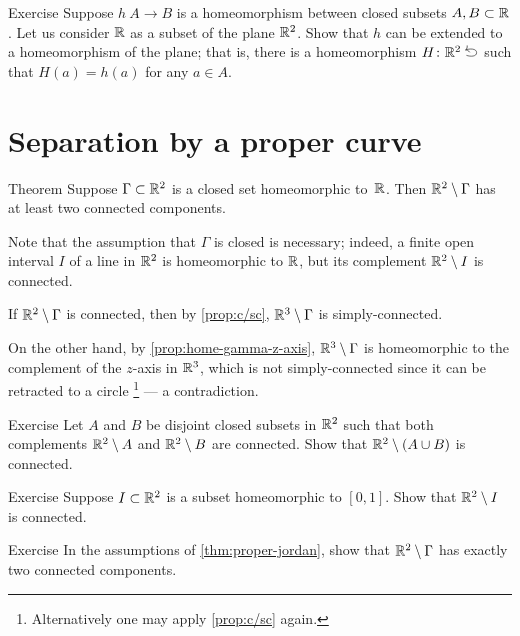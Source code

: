 \begin{thm}{Exercise}\label{ex:klee1-2}
Suppose $h\:A\to B$ is a homeomorphism between closed subsets $A,B\subset \mathbb{R}$.
Let us consider $\mathbb{R}$ as a subset of the plane $\mathbb{R}^2$.
Show that $h$ can be extended to a homeomorphism of the plane;
that is, there is a homeomorphism $H\:\RR^2\selfup$ such that $H(a)=h(a)$ for any $a\in A$.
\end{thm}


\section{Separation by a proper curve}

\begin{thm}{Theorem}\label{thm:proper-jordan}
Suppose $\Gamma\subset\mathbb{R}^2$ is a closed set homeomorphic to~$\mathbb{R}$.
Then $\mathbb{R}^2\setminus \Gamma$ has at least two connected components.
\end{thm}

Note that the assumption that $\Gamma$ is closed is necessary;
indeed, a finite open interval $I$ of a line in $\mathbb{R}^2$ is homeomorphic to $\mathbb{R}$, but its complement $\mathbb{R}^2\setminus I$ is connected.

If $\mathbb{R}^2\setminus \Gamma$ is connected, then by \ref{prop:c/sc}, $\mathbb{R}^3\setminus \Gamma$ is simply-connected.

On the other hand, by \ref{prop:home-gamma-z-axis}, $\mathbb{R}^3\setminus \Gamma$ is homeomorphic to the complement of the $z$-axis in $\mathbb{R}^3$,
which is not simply-connected since it can be retracted to a circle%
\footnote{Alternatively one may apply \ref{prop:c/sc} again.} --- a contradiction.
\qeds

\begin{thm}{Exercise}\label{ex:connected-complement}
Let $A$ and $B$ be disjoint closed subsets in $\mathbb{R}^2$ such that both complements $\mathbb{R}^2\setminus A$ and $\mathbb{R}^2\setminus B$ are connected.
Show that $\mathbb{R}^2\setminus(A\cup B)$ is connected.
\end{thm}

\begin{thm}{Exercise}\label{ex:jordanI+}
Suppose $I\subset \mathbb{R}^2$ is a subset homeomorphic to $[0,1]$.
Show that $\mathbb{R}^2\setminus I$ is connected.
\end{thm}

\begin{thm}{Exercise}\label{ex:proper-jordan3}
In the assumptions of \ref{thm:proper-jordan}, show that $\mathbb{R}^2\setminus \Gamma$ has exactly two connected components.
\end{thm}


